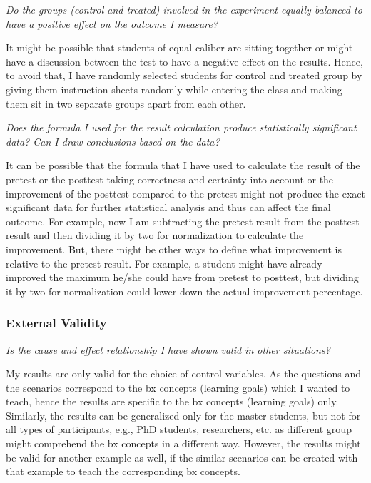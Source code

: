 \emph{Do the groups (control and treated) involved in the experiment equally balanced to have a positive effect on the outcome I measure?}

\medskip
\noindent It might be possible that students of equal caliber are sitting together or might have a discussion between the test to have a negative effect on the results. Hence, to avoid that, I have randomly selected students for control and treated group by giving them instruction sheets randomly while entering the class and making them sit in two separate groups apart from each other.

\emph{Does the formula I used for the result calculation produce statistically significant data? Can I draw conclusions based on the data?}

\medskip
\noindent It can be possible that the formula that I have used to calculate the result of the pretest or the posttest taking correctness and certainty into account or the improvement of the posttest compared to the pretest might not produce the exact significant data for further statistical analysis and thus can affect the final outcome. For example, now I am subtracting the pretest result from the posttest result and then dividing it by two for normalization to calculate the improvement. But, there might be other ways to define what improvement is relative to the pretest result. For example, a student might have already improved the maximum he/she could have from pretest to posttest, but dividing it by two for normalization could lower down the actual improvement percentage.

\subsubsection{External Validity}\label{subsubsec:externalvalidity}
\emph{Is the cause and effect relationship I have shown valid in other situations?}

\medskip
\noindent My results are only valid for the choice of control variables. As the questions and the scenarios correspond to the bx concepts (learning goals) which I wanted to teach, hence the results are specific to the bx concepts (learning goals) only. Similarly, the results can be generalized only for the master students, but not for all types of participants, e.g., PhD students, researchers, etc. as different group might comprehend the bx concepts in a different way. However, the results might be valid for another example as well, if the similar scenarios can be created with that example to teach the corresponding bx concepts.

